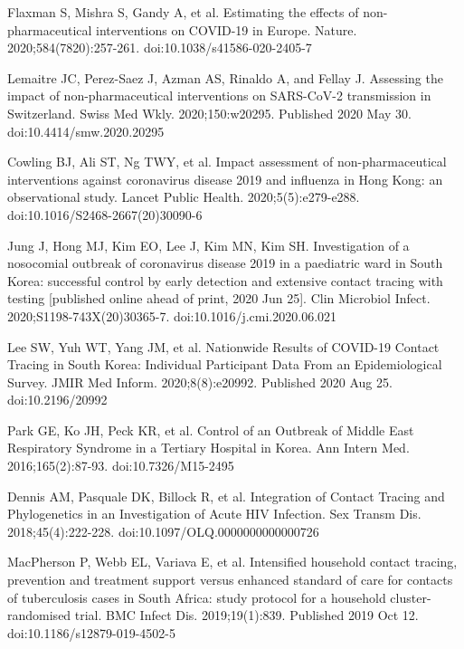 \documentclass{article}
\begin{document}
\begin{thebibliography}{1}

  Flaxman S, Mishra S, Gandy A, et al.
  \newblock Estimating the effects of non-pharmaceutical interventions on
  COVID-19 in Europe.
  \newblock Nature. 2020;584(7820):257-261.
  \newblock doi:10.1038/s41586-020-2405-7

  Lemaitre JC, Perez-Saez J, Azman AS, Rinaldo A, and Fellay J.
  \newblock Assessing the impact of non-pharmaceutical interventions on
  SARS-CoV-2 transmission in Switzerland.
  \newblock Swiss Med Wkly. 2020;150:w20295. Published 2020 May 30.
  \newblock doi:10.4414/smw.2020.20295

  Cowling BJ, Ali ST, Ng TWY, et al.
  \newblock Impact assessment of non-pharmaceutical interventions against
  coronavirus disease 2019 and influenza in Hong Kong: an observational study.
  \newblock Lancet Public Health. 2020;5(5):e279-e288.
  \newblock doi:10.1016/S2468-2667(20)30090-6

  Jung J, Hong MJ, Kim EO, Lee J, Kim MN, Kim SH.
  \newblock Investigation of a nosocomial outbreak of coronavirus disease 2019
  in a paediatric ward in South Korea: successful control by early detection and
  extensive contact tracing with testing [published online ahead of print, 2020
    Jun 25].
  \newblock Clin Microbiol Infect. 2020;S1198-743X(20)30365-7.
  \newblock doi:10.1016/j.cmi.2020.06.021

  Lee SW, Yuh WT, Yang JM, et al.
  \newblock Nationwide Results of COVID-19 Contact Tracing in South Korea:
  Individual Participant Data From an Epidemiological Survey.
  \newblock JMIR Med Inform. 2020;8(8):e20992. Published 2020 Aug 25.
  \newblock doi:10.2196/20992

  Park GE, Ko JH, Peck KR, et al.
  \newblock Control of an Outbreak of Middle East Respiratory Syndrome in a
  Tertiary Hospital in Korea.
  \newblock Ann Intern Med. 2016;165(2):87-93.
  \newblock doi:10.7326/M15-2495

  Dennis AM, Pasquale DK, Billock R, et al.
  \newblock Integration of Contact Tracing and Phylogenetics in an Investigation
  of Acute HIV Infection.
  \newblock Sex Transm Dis. 2018;45(4):222-228.
  \newblock doi:10.1097/OLQ.0000000000000726

  MacPherson P, Webb EL, Variava E, et al.
  \newblock Intensified household contact tracing, prevention and treatment
  support versus enhanced standard of care for
  contacts of tuberculosis cases in South Africa: study protocol for a household
  cluster-randomised trial.
  \newblock BMC Infect Dis. 2019;19(1):839. Published 2019 Oct 12.
  \newblock doi:10.1186/s12879-019-4502-5


\end{thebibliography}
\end{document}
